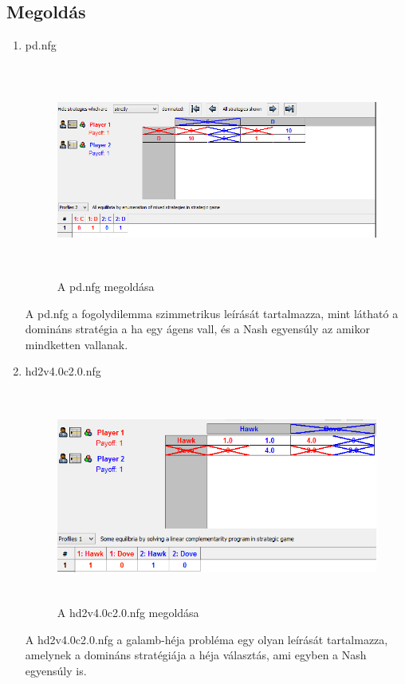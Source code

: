 \subsection{Megoldás}
\begin{enumerate}
\item pd.nfg
		\begin{figure}[h]
		\begin{center}
		\includegraphics[height=7cm]{figures/pd_nfg_dom.png}
		\caption{A pd.nfg megoldása}
		\end{center}
		\end{figure}
A pd.nfg a fogolydilemma szimmetrikus leírását tartalmazza, mint látható a domináns stratégia a ha egy ágens vall, és a Nash egyensúly az amikor mindketten vallanak.
		
\item hd2v4.0c2.0.nfg
		\begin{figure}[h]
		\begin{center}
		\includegraphics[height=7cm]{figures/hd2v4_dom.png}
		\caption{A hd2v4.0c2.0.nfg megoldása}
		\end{center}
		\end{figure}
A hd2v4.0c2.0.nfg a galamb-héja probléma egy olyan leírását tartalmazza, amelynek a domináns stratégiája a héja választás, ami egyben a Nash egyensúly is.
		

\end{enumerate}
